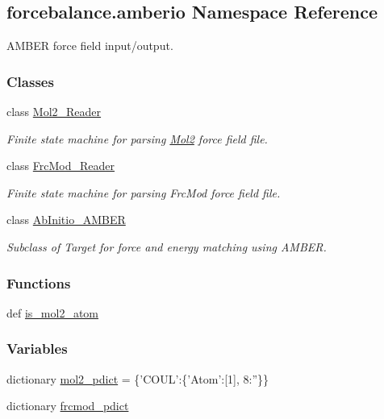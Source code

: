 \hypertarget{namespaceforcebalance_1_1amberio}{\subsection{forcebalance.\-amberio Namespace Reference}
\label{namespaceforcebalance_1_1amberio}
}


A\-M\-B\-E\-R force field input/output.  


\subsubsection*{Classes}
\begin{DoxyCompactItemize}
\item 
class \hyperlink{classforcebalance_1_1amberio_1_1Mol2__Reader}{Mol2\-\_\-\-Reader}
\begin{DoxyCompactList}\small\item\em Finite state machine for parsing \hyperlink{namespaceforcebalance_1_1Mol2}{Mol2} force field file. \end{DoxyCompactList}\item 
class \hyperlink{classforcebalance_1_1amberio_1_1FrcMod__Reader}{Frc\-Mod\-\_\-\-Reader}
\begin{DoxyCompactList}\small\item\em Finite state machine for parsing Frc\-Mod force field file. \end{DoxyCompactList}\item 
class \hyperlink{classforcebalance_1_1amberio_1_1AbInitio__AMBER}{Ab\-Initio\-\_\-\-A\-M\-B\-E\-R}
\begin{DoxyCompactList}\small\item\em Subclass of Target for force and energy matching using A\-M\-B\-E\-R. \end{DoxyCompactList}\end{DoxyCompactItemize}
\subsubsection*{Functions}
\begin{DoxyCompactItemize}
\item 
def \hyperlink{namespaceforcebalance_1_1amberio_af59589a24e815a11db69dcaa21c51659}{is\-\_\-mol2\-\_\-atom}
\end{DoxyCompactItemize}
\subsubsection*{Variables}
\begin{DoxyCompactItemize}
\item 
dictionary \hyperlink{namespaceforcebalance_1_1amberio_a84f51a0ccf50d3442cefb90f948653b0}{mol2\-\_\-pdict} = \{'C\-O\-U\-L'\-:\{'Atom'\-:\mbox{[}1\mbox{]}, 8\-:''\}\}
\item 
dictionary \hyperlink{namespaceforcebalance_1_1amberio_a7d8a1776c628e73cc2f4fb6eba17030a}{frcmod\-\_\-pdict}
\end{DoxyCompactItemize}


